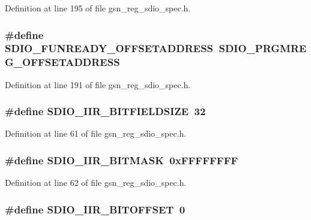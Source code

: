 Definition at line 195 of file gsn\_\-reg\_\-sdio\_\-spec.h.

\hypertarget{a00571_a785953df52b693fb60a69f747bb66a30}{
\subsubsection[{SDIO\_\-FUNREADY\_\-OFFSETADDRESS}]{\setlength{\rightskip}{0pt plus 5cm}\#define SDIO\_\-FUNREADY\_\-OFFSETADDRESS~SDIO\_\-PRGMREG\_\-OFFSETADDRESS}}
\label{a00571_a785953df52b693fb60a69f747bb66a30}


Definition at line 191 of file gsn\_\-reg\_\-sdio\_\-spec.h.

\hypertarget{a00571_ad52466c2114460b5ba385eb4bb4d6992}{
\subsubsection[{SDIO\_\-IIR\_\-BITFIELDSIZE}]{\setlength{\rightskip}{0pt plus 5cm}\#define SDIO\_\-IIR\_\-BITFIELDSIZE~32}}
\label{a00571_ad52466c2114460b5ba385eb4bb4d6992}


Definition at line 61 of file gsn\_\-reg\_\-sdio\_\-spec.h.

\hypertarget{a00571_ad0600802205634236f406597a6f1aec9}{
\subsubsection[{SDIO\_\-IIR\_\-BITMASK}]{\setlength{\rightskip}{0pt plus 5cm}\#define SDIO\_\-IIR\_\-BITMASK~0xFFFFFFFF}}
\label{a00571_ad0600802205634236f406597a6f1aec9}


Definition at line 62 of file gsn\_\-reg\_\-sdio\_\-spec.h.

\hypertarget{a00571_a20a50a6efa21d215083db74b0e2b6b6a}{
\subsubsection[{SDIO\_\-IIR\_\-BITOFFSET}]{\setlength{\rightskip}{0pt plus 5cm}\#define SDIO\_\-IIR\_\-BITOFFSET~0}}
\label{a00571_a20a50a6efa21d215083db74b0e2b6b6a}



